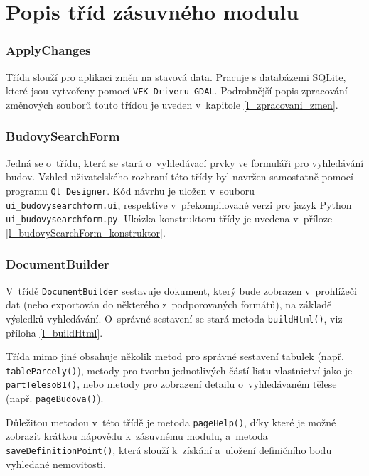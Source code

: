 \documentclass[a4paper,12pt,oneside]{book}
\begin{document}
\clearpage
\section{Popis tříd zásuvného modulu}

\subsubsection{ApplyChanges}
Třída slouží pro aplikaci změn na stavová data. Pracuje s databázemi SQLite,
které jsou vytvořeny pomocí \texttt{VFK Driveru GDAL}. Podrobnější popis 
zpracování změnových souborů touto třídou je uveden v~kapitole
\ref{l_zpracovani_zmen}.

\subsubsection{BudovySearchForm}
Jedná se o~třídu, která se stará o~vyhledávací prvky ve formuláři pro
vyhledávání budov. Vzhled
uživatelského rozhraní této třídy byl navržen samostatně pomocí
programu \texttt{Qt Designer}. Kód návrhu je uložen v~souboru
\texttt{ui\_budovysearchform.ui}, respektive v~překompilované verzi
pro jazyk Python \texttt{ui\_budovysearchform.py}. Ukázka konstruktoru
třídy je uvedena v~příloze \ref{l_budovySearchForm_konstruktor}.

\subsubsection{DocumentBuilder}
V~třídě \texttt{DocumentBuilder} sestavuje dokument, který bude
zobrazen v~prohlížeči dat (nebo exportován do některého
z~podporovaných formátů), na základě výsledků vyhledávání. O~správné
sestavení se stará metoda \texttt{buildHtml()}, viz příloha
\ref{l_buildHtml}.

Třída mimo jiné obsahuje několik metod pro správné sestavení tabulek
(např. \texttt{tableParcely()}), metody pro tvorbu jednotlivých částí
listu vlastnictví jako je \texttt{partTelesoB1()}, nebo metody pro
zobrazení detailu o~vyhledávaném tělese (např. \texttt{pageBudova()}).

Důležitou metodou v~této třídě je metoda \texttt{pageHelp()}, díky
které je možné zobrazit krátkou nápovědu k~zásuvnému modulu, a~metoda
\texttt{saveDefinitionPoint()}, která slouží
k~získání a~uložení definičního bodu vyhledané nemovitosti.
\end{document}
